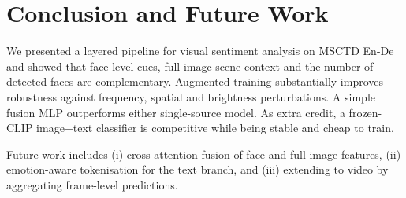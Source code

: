 \documentclass[conference]{IEEEtran}
\begin{document}
\section{Conclusion and Future Work}\label{sec:conc}
We presented a layered pipeline for visual sentiment analysis on
MSCTD En-De and showed that face-level cues, full-image scene context
and the number of detected faces are complementary. Augmented training
substantially improves robustness against frequency, spatial and
brightness perturbations. A simple fusion MLP outperforms either
single-source model. As extra credit, a frozen-CLIP image+text
classifier is competitive while being stable and cheap to train.

Future work includes (i) cross-attention fusion of face and full-image
features, (ii) emotion-aware tokenisation for the text branch, and
(iii) extending to video by aggregating frame-level predictions.



\end{document}
